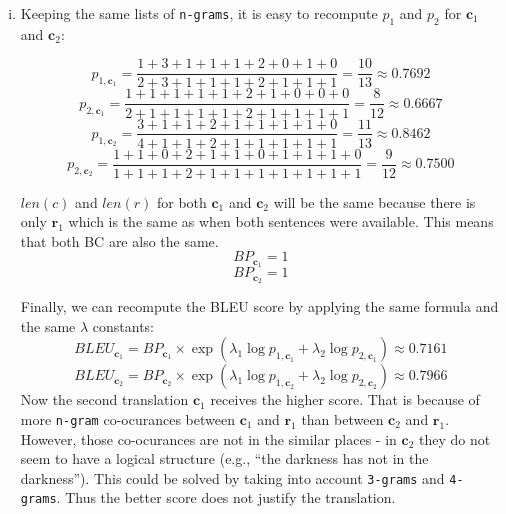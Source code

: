 \begin{parts}
{\begin{enumerate}[i.]
    The better translation is $\mathbf{c}_1$ since $BLEU_{\mathbf{c}_1}>BLEU_{\mathbf{c}_2}$. This is indeed reflected in the translation as it is more similar to the reference sentences and has a more logical flow than $\mathbf{c}_2$.
    
    \item Keeping the same lists of \texttt{n-grams}, it is easy to recompute $p_1$ and $p_2$ for $\mathbf{c}_1$ and $\mathbf{c}_2$:
    
    \begin{equation}
        p_{1, \mathbf{c}_1} = \frac{1+3+1+1+1+2+0+1+0}{2+3+1+1+1+2+1+1+1} = \frac{10}{13} \approx 0.7692
    \end{equation}
    \begin{equation}
        p_{2, \mathbf{c}_1} = \frac{1+1+1+1+1+2+1+0+0+0}{2+1+1+1+1+2+1+1+1+1} = \frac{8}{12} \approx 0.6667
    \end{equation}
    \begin{equation}
        p_{1, \mathbf{c}_2} = \frac{3+1+1+2+1+1+1+1+0}{4+1+1+2+1+1+1+1+1} = \frac{11}{13} \approx 0.8462
    \end{equation}
    \begin{equation}
        p_{2, \mathbf{c}_2} = \frac{1+1+0+2+1+1+0+1+1+1+0}{1+1+1+2+1+1+1+1+1+1+1} = \frac{9}{12} \approx 0.7500
    \end{equation}
    
    $len(c)$ and $len(r)$ for both $\mathbf{c}_1$ and $\mathbf{c}_2$ will be the same because there is only $\mathbf{r}_1$ which is the same as when both sentences were available. This means that both BC are also the same.
    \begin{equation}
        BP_{\mathbf{c}_1}=1
    \end{equation}
    \begin{equation}
        BP_{\mathbf{c}_2}=1
    \end{equation}
    
    Finally, we can recompute the BLEU score by applying the same formula and the same $\lambda$ constants:
    \begin{equation}
        BLEU_{\mathbf{c}_1}=BP_{\mathbf{c}_1}\times\exp\left(\lambda_1\log p_{1, \mathbf{c}_1}+\lambda_2\log p_{2, \mathbf{c}_1}\right)\approx 0.7161
    \end{equation}
    \begin{equation}
        BLEU_{\mathbf{c}_2}=BP_{\mathbf{c}_2}\times\exp\left(\lambda_1\log p_{1, \mathbf{c}_2}+\lambda_2\log p_{2, \mathbf{c}_2}\right)\approx 0.7966
    \end{equation}
    Now the second translation $\mathbf{c}_1$ receives the higher score. That is because of more \texttt{n-gram} co-ocurances between $\mathbf{c}_1$ and $\mathbf{r}_1$ than between $\mathbf{c}_2$ and $\mathbf{r}_1$. However, those co-ocurances are not in the similar places - in $\mathbf{c}_2$ they do not seem to have a logical structure (e.g., ``the darkness has not in the darkness''). This could be solved by taking into account \texttt{3-grams} and \texttt{4-grams}. Thus the better score does not justify the translation.
    

\end{enumerate}}
\end{parts}
